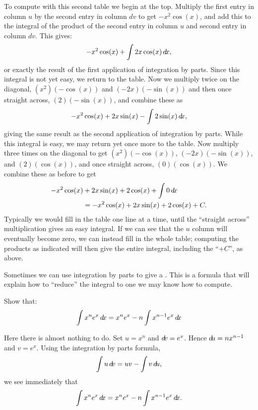 \documentclass{ximera}
\begin{document}
To compute with this second table we begin at the top. Multiply the
first entry in column $u$ by the second entry in column $dv$ to get
$-x^2\cos(x)$, and add this to the integral of the product of the
second entry in column $u$ and second entry in column $dv$.  This
gives:
$$-x^2\cos(x)+\int 2x\cos(x)\mathop{}\!d\! x,$$
or exactly the result of the first application of integration by
parts.  Since this integral is not yet easy, we return to the table.
Now we multiply twice on the diagonal, $(x^2)(-\cos(x))$ and
$(-2x)(-\sin(x))$ and then once straight across, $(2)(-\sin(x))$, and
combine these as
\[
-x^2\cos(x)+2x\sin(x)-\int 2\sin(x)\mathop{}\!d\! x,
\]
giving the same result as the second application of integration by
parts. While this integral is easy, we may return yet once more to the
table. Now multiply three times on the diagonal to get
$(x^2)(-\cos(x))$, $(-2x)(-\sin(x))$, and $(2)(\cos(x))$, and once
straight across, $(0)(\cos(x))$. We combine these as before to get
\begin{align*}
  -x^2\cos(x)&+2x\sin(x) +2\cos(x)+\int 0\mathop{}\!d\! x\\
  &=-x^2\cos(x)+2x\sin(x) +2\cos(x)+C.
\end{align*}
Typically we would fill in the table one line at a time, until the
``straight across'' multiplication gives an easy integral. If we can
see that the $u$ column will eventually become zero, we can instead
fill in the whole table; computing the products as indicated will then
give the entire integral, including the ``$+C$'', as above.



Sometimes we can use integration by parts to give a .
This is a formula that will explain how to ``reduce''
the integral to one we may know how to compute.

\begin{example}
  Show that:
  \[
  \int x^n e^x \mathop{}\!d\! x = x^n e^x -n \int x^{n-1} e^x\mathop{}\!d\! x
  \]
  \begin{explanation}
    Here there is almost nothing to do. Set $u= x^n$ and $\mathop{}\!d\! v =
    e^x$. Hence $\mathop{}\!d\! u = n x^{n-1}$ and $v = e^x$. Using the
    integration by parts formula,
    \[
    \int u\mathop{}\!d\! v = uv-\int v\mathop{}\!d\! u,
    \]
    we see immediately that
    \[
    \int x^n e^x \mathop{}\!d\! x = x^n e^x -n \int x^{n-1} e^x \mathop{}\!d\! x.
    \]
  \end{explanation}
\end{example}
\end{document}
